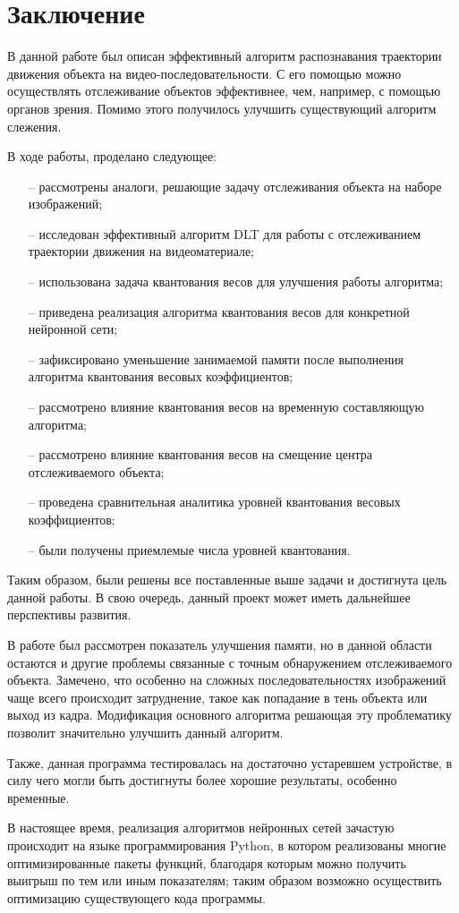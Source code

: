 \section*{Заключение}

В данной работе был описан эффективный алгоритм распознавания траектории движения объекта на видео-последовательности. С его помощью можно осуществлять отслеживание объектов эффективнее, чем, например, с помощью органов зрения. Помимо этого получилось улучшить существующий алгоритм слежения. 

В ходе работы, проделано следующее:

\begin{itemize}[leftmargin=0em, itemindent=2.5 em,itemsep=1.5 pt,parsep=1.5 pt]

    \item[--] рассмотрены аналоги, решающие задачу отслеживания объекта на наборе изображений;
    \item[--] исследован эффективный алгоритм DLT для работы с отслеживанием траектории движения на видеоматериале;
    \item[--] использована задача квантования весов для улучшения работы алгоритма;
    \item[--] приведена реализация алгоритма квантования весов для конкретной нейронной сети;
    \item[--] зафиксировано уменьшение занимаемой памяти после выполнения алгоритма квантования весовых коэффициентов;
    \item[--] рассмотрено влияние квантования весов на временную составляющую алгоритма;
    \item[--] рассмотрено влияние квантования весов на смещение центра отслеживаемого объекта;
    \item[--] проведена сравнительная аналитика уровней квантования весовых коэффициентов;
    \item[--] были получены приемлемые числа уровней квантования.
\end{itemize}

Таким образом, были решены все поставленные выше задачи и достигнута цель данной работы. В свою очередь, данный проект может иметь дальнейшее перспективы развития. 

В работе был рассмотрен показатель улучшения памяти, но в данной области остаются и другие проблемы связанные с точным обнаружением отслеживаемого объекта. Замечено, что особенно на сложных последовательностях изображений чаще всего происходит затруднение, такое как попадание в тень объекта или выход из кадра. Модификация основного алгоритма решающая эту проблематику позволит значительно улучшить данный алгоритм.

Также, данная программа тестировалась на достаточно устаревшем устройстве, в силу чего могли быть достигнуты более хорошие результаты, особенно временные. 

В настоящее время, реализация алгоритмов нейронных сетей зачастую происходит на языке программирования Python, в котором реализованы многие оптимизированные пакеты функций, благодаря которым можно получить выигрыш по тем или иным показателям; таким образом возможно осуществить оптимизацию существующего кода программы. 